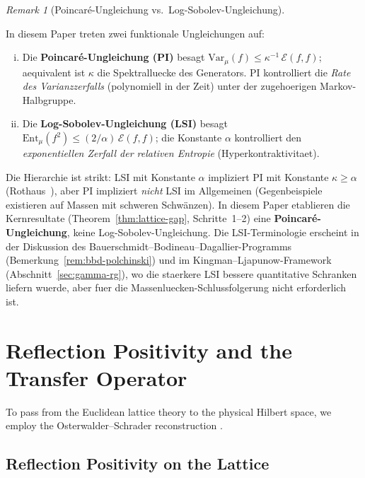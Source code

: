 \documentclass[12pt,a4paper]{article}
\theoremstyle{definition}
\theoremstyle{plain}
\theoremstyle{remark}
\newtheorem{remark}[definition]{Remark}
\begin{document}
\begin{remark}[Poincar\'e-Ungleichung vs.\ Log-Sobolev-Ungleichung]\label{rem:pi-vs-lsi}
\begin{sloppypar}
In diesem Paper treten zwei funktionale Ungleichungen auf:
\begin{enumerate}[(i)]
\item Die \textbf{Poincar\'e-Ungleichung (PI)} besagt $\mathrm{Var}_\mu(f) \leq \kappa^{-1}\,\mathcal{E}(f,f)$; aequivalent ist $\kappa$ die Spektralluecke des Generators. PI kontrolliert die \emph{Rate des Varianzzerfalls} (polynomiell in der Zeit) unter der zugehoerigen Markov-Halbgruppe.
\item Die \textbf{Log-Sobolev-Ungleichung (LSI)} besagt $\mathrm{Ent}_\mu(f^2) \leq (2/\alpha)\,\mathcal{E}(f,f)$; die Konstante $\alpha$ kontrolliert den \emph{exponentiellen Zerfall der relativen Entropie} (Hyperkontraktivitaet).
\end{enumerate}
Die Hierarchie ist strikt: LSI mit Konstante $\alpha$ impliziert PI mit Konstante $\kappa \geq \alpha$ (Rothaus~\cite{Rothaus1985}), aber PI impliziert \emph{nicht} LSI im Allgemeinen (Gegenbeispiele existieren auf Massen mit schweren Schwänzen). In diesem Paper etablieren die Kernresultate (Theorem~\ref{thm:lattice-gap}, Schritte~1--2) eine \textbf{Poincar\'e-Ungleichung}, keine Log-Sobolev-Ungleichung. Die LSI-Terminologie erscheint in der Diskussion des Bauerschmidt--Bodineau--Dagallier-Programms (Bemerkung~\ref{rem:bbd-polchinski}) und im Kingman--Ljapunow-Framework (Abschnitt~\ref{sec:gamma-rg}), wo die staerkere LSI bessere quantitative Schranken liefern wuerde, aber fuer die Massenluecken-Schlussfolgerung nicht erforderlich ist.
\end{sloppypar}
\end{remark}

\section{Reflection Positivity and the Transfer Operator}

To pass from the Euclidean lattice theory to the physical Hilbert space, we employ the Osterwalder--Schrader reconstruction \cite{OsterwalderSchrader1973, OsterwalderSchrader1975}.

\subsection{Reflection Positivity on the Lattice}
\end{document}
